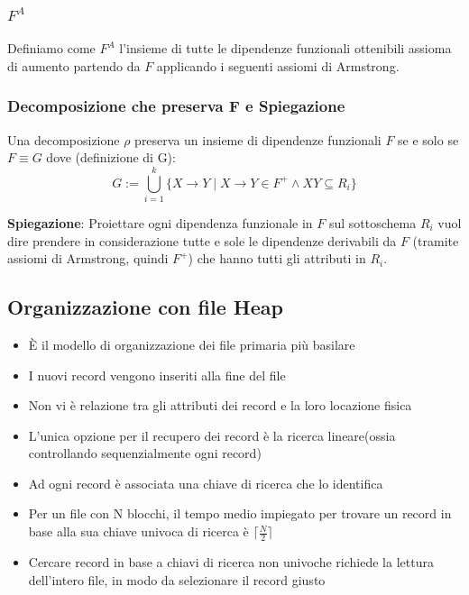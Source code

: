 \documentclass{article}
\begin{document}
\subsubsection{$F^A$}
Definiamo come $F^A$ l'insieme di tutte le dipendenze funzionali ottenibili assioma di aumento partendo da $F$ applicando i seguenti assiomi di Armstrong.

\subsubsection{Decomposizione che preserva F e Spiegazione}
Una decomposizione $\rho$ preserva un insieme di dipendenze funzionali $F$ se e solo se $F \equiv G$ dove (definizione di G):
\[ G := \bigcup_{i=1}^{k} \{X \rightarrow Y \mid X \rightarrow Y \in F^+ \land XY \subseteq R_i \} \]

\textbf{Spiegazione}: Proiettare ogni dipendenza funzionale in $F$ sul sottoschema $R_i$ vuol dire prendere in considerazione tutte e sole le dipendenze derivabili da $F$ (tramite assiomi di Armstrong, quindi $F^+$) che hanno tutti gli attributi in $R_i$.


\subsection{Organizzazione con file Heap}
\begin{itemize}
  \item È il modello di organizzazione dei file primaria più basilare
  \item I nuovi record vengono inseriti alla fine del file
  \item Non vi è relazione tra gli attributi dei record e la loro locazione fisica
  \item L'unica opzione per il recupero dei record è la ricerca lineare(ossia controllando sequenzialmente ogni record)
  \item Ad ogni record è associata una chiave di ricerca che lo identifica
  \item Per un file con N blocchi, il tempo medio impiegato per trovare un record
  in base alla sua chiave univoca di ricerca è $\lceil \frac{N}{2} \rceil$
  \item Cercare record in base a chiavi di ricerca non univoche richiede la lettura dell'intero file, in modo da selezionare il record giusto
\end{itemize}
\end{document}
